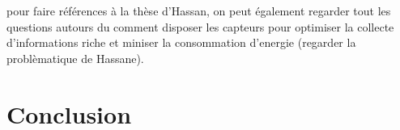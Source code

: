 pour faire références à la thèse d'Hassan, on peut également regarder tout les questions autours du comment disposer les capteurs pour optimiser la collecte d'informations riche et miniser la consommation d'energie (regarder la problèmatique de Hassane). 

\section{Conclusion}





\newpage\thispagestyle{empty}